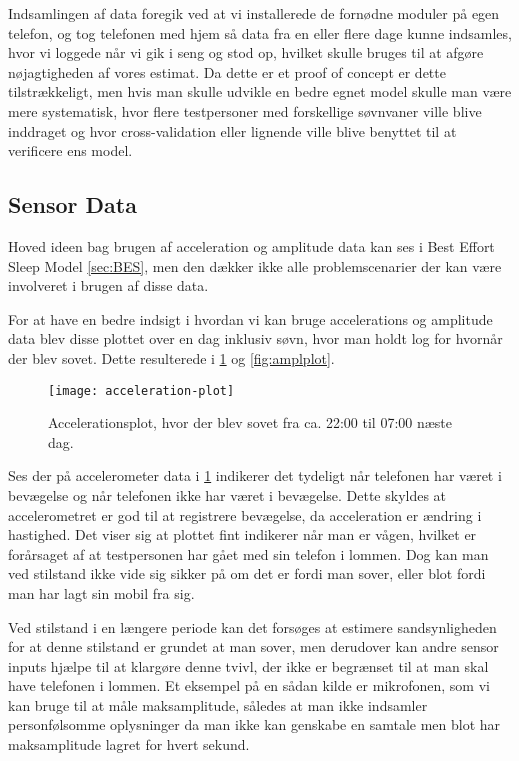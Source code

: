 Indsamlingen af data foregik ved at vi installerede de fornødne moduler på egen telefon, og tog telefonen med hjem så data fra en eller flere dage kunne indsamles, hvor vi loggede når vi gik i seng og stod op, hvilket skulle bruges til at afgøre nøjagtigheden af vores estimat.
Da dette er et proof of concept er dette tilstrækkeligt, men hvis man skulle udvikle en bedre egnet model skulle man være mere systematisk, hvor flere testpersoner med forskellige søvnvaner ville blive inddraget og hvor cross-validation eller lignende ville blive benyttet til at verificere ens model.

\subsection{Sensor Data}
Hoved ideen bag brugen af acceleration og amplitude data kan ses i Best Effort Sleep Model \cref{sec:BES}, men den dækker ikke alle problemscenarier der kan være involveret i brugen af disse data.

For at have en bedre indsigt i hvordan vi kan bruge accelerations og amplitude data blev disse plottet over en dag inklusiv søvn, hvor man holdt log for hvornår der blev sovet.
Dette resulterede i \cref{fig:accplot} og \cref{fig:amplplot}.

\begin{figure}[h]
	\centering
	\texttt{[image: acceleration-plot]}
	\caption{Accelerationsplot, hvor der blev sovet fra ca. 22:00 til 07:00 næste dag.}\label{fig:accplot}
\end{figure}

Ses der på accelerometer data i \cref{fig:accplot} indikerer det tydeligt når telefonen har været i bevægelse og når telefonen ikke har været i bevægelse.
Dette skyldes at accelerometret er god til at registrere bevægelse, da acceleration er ændring i hastighed.
Det viser sig at plottet fint indikerer når man er vågen, hvilket er forårsaget af at testpersonen har gået med sin telefon i lommen.
Dog kan man ved stilstand ikke vide sig sikker på om det er fordi man sover, eller blot fordi man har lagt sin mobil fra sig.

Ved stilstand i en længere periode kan det forsøges at estimere sandsynligheden for at denne stilstand er grundet at man sover, men derudover kan andre sensor inputs hjælpe til at klargøre denne tvivl, der ikke er begrænset til at man skal have telefonen i lommen.
Et eksempel på en sådan kilde er mikrofonen, som vi kan bruge til at måle maksamplitude, således at man ikke indsamler personfølsomme oplysninger da man ikke kan genskabe en samtale men blot har maksamplitude lagret for hvert sekund.

